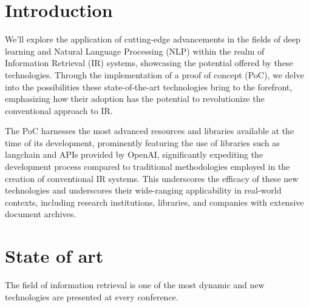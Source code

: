\documentclass[12pt, a4paper, twocolumn]{article}
\begin{document}

\twocolumn[
  \begin{@twocolumnfalse}
    \maketitle
    \begin{abstract}
      \abstractText
      \newline
      \newline
    \end{abstract}
  \end{@twocolumnfalse}
]


\section{Introduction}

We'll explore the application of cutting-edge advancements in the fields of deep learning and Natural Language Processing (NLP) within the realm of Information Retrieval (IR) systems, showcasing the potential offered by these technologies. Through the implementation of a proof of concept (PoC), we delve into the possibilities these state-of-the-art technologies bring to the forefront, emphasizing how their adoption has the potential to revolutionize the conventional approach to IR.

The PoC harnesses the most advanced resources and libraries available at the time of its development, prominently featuring the use of libraries such as langchain and APIs provided by OpenAI, significantly expediting the development process compared to traditional methodologies employed in the creation of conventional IR systems. This underscores the efficacy of these new technologies and underscores their wide-ranging applicability in real-world contexts, including research institutions, libraries, and companies with extensive document archives.

\section{State of art}

The field of information retrieval is one of the most dynamic and new technologies are presented at every conference.



\nocite{*}


\end{document}
